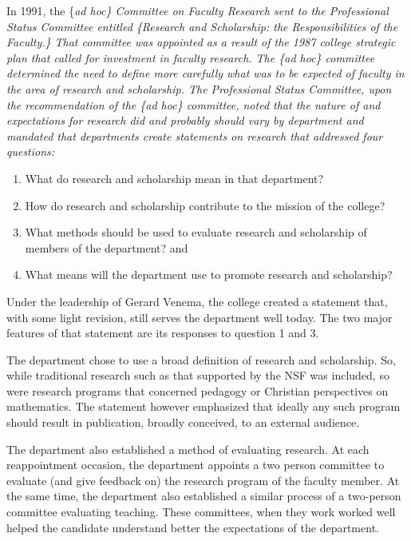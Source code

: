 \documentclass[
]{book}
\providecommand{\tightlist}{%
  \setlength{\itemsep}{0pt}\setlength{\parskip}{0pt}}
\begin{document}
In 1991, the \{\em ad hoc\} Committee on Faculty Research sent to the Professional Status Committee entitled \{\em Research and Scholarship: the Responsibilities of the Faculty.\} That committee was appointed as a result of the 1987 college strategic plan that called for investment in faculty research. The \{\em ad hoc\} committee determined the need to define more carefully what was to be expected of faculty in the area of research and scholarship. The Professional Status Committee, upon the recommendation of the \{\em ad hoc\} committee, noted that the nature of and expectations for research did and probably should vary by department and mandated that departments create statements on research that addressed four questions:

\begin{enumerate}
\def\labelenumi{\arabic{enumi}.}
\tightlist
\item
  What do research and scholarship mean in that department?
\item
  How do research and scholarship contribute to the mission of
  the college?
\item
  What methods should be used to evaluate research
  and scholarship of members of the department? and
\item
  What means will the department use to promote research and scholarship?
\end{enumerate}

Under the leadership of Gerard Venema, the college created a statement that, with some light revision, still serves the department well today. The two major features of that statement are its responses to question 1 and 3.

The department chose to use a broad definition of research and scholarship. So, while traditional research such as that supported by the NSF was included, so were research programs that concerned pedagogy or Christian perspectives on mathematics. The statement however emphasized that ideally any such program should result in publication, broadly conceived, to an external audience.

The department also established a method of evaluating research. At each reappointment occasion, the department appoints a two person committee to evaluate (and give feedback on) the research program of the faculty member. At the same time, the department also established a similar process of a two-person committee evaluating teaching. These committees, when they work worked well helped the candidate understand better the expectations of the department.
\end{document}
